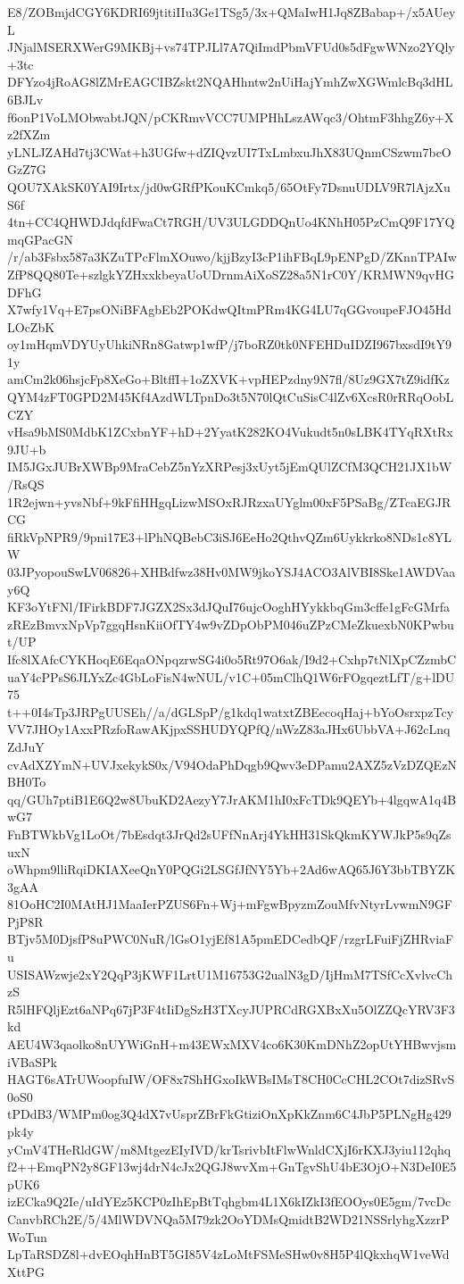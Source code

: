 E8/ZOBmjdCGY6KDRI69jtitiIIu3Ge1TSg5/3x+QMaIwH1Jq8ZBabap+/x5AUeyL
JNjalMSERXWerG9MKBj+vs74TPJLl7A7QiImdPbmVFUd0s5dFgwWNzo2YQly+3tc
DFYzo4jRoAG8lZMrEAGCIBZskt2NQAHhntw2nUiHajYmhZwXGWmlcBq3dHL6BJLv
f6onP1VoLMObwabtJQN/pCKRmvVCC7UMPHhLszAWqc3/OhtmF3hhgZ6y+Xz2fXZm
yLNLJZAHd7tj3CWat+h3UGfw+dZIQvzUI7TxLmbxuJhX83UQnmCSzwm7bcOGzZ7G
QOU7XAkSK0YAI9Irtx/jd0wGRfPKouKCmkq5/65OtFy7DsnuUDLV9R7lAjzXuS6f
4tn+CC4QHWDJdqfdFwaCt7RGH/UV3ULGDDQnUo4KNhH05PzCmQ9F17YQmqGPacGN
/r/ab3Fsbx587a3KZuTPcFlmXOuwo/kjjBzyI3cP1ihFBqL9pENPgD/ZKnnTPAIw
ZfP8QQ80Te+szlgkYZHxxkbeyaUoUDrnmAiXoSZ28a5N1rC0Y/KRMWN9qvHGDFhG
X7wfy1Vq+E7psONiBFAgbEb2POKdwQItmPRm4KG4LU7qGGvoupeFJO45HdLOcZbK
oy1mHqmVDYUyUhkiNRn8Gatwp1wfP/j7boRZ0tk0NFEHDuIDZI967bxsdI9tY91y
amCm2k06hsjcFp8XeGo+BltffI+1oZXVK+vpHEPzdny9N7fl/8Uz9GX7tZ9idfKz
QYM4zFT0GPD2M45Kf4AzdWLTpnDo3t5N70lQtCuSisC4lZv6XcsR0rRRqOobLCZY
vHsa9bMS0MdbK1ZCxbnYF+hD+2YyatK282KO4Vukudt5n0sLBK4TYqRXtRx9JU+b
IM5JGxJUBrXWBp9MraCebZ5nYzXRPesj3xUyt5jEmQUlZCfM3QCH21JX1bW/RsQS
1R2ejwn+yvsNbf+9kFfiHHgqLizwMSOxRJRzxaUYglm00xF5PSaBg/ZTcaEGJRCG
fiRkVpNPR9/9pni17E3+lPhNQBebC3iSJ6EeHo2QthvQZm6Uykkrko8NDs1c8YLW
03JPyopouSwLV06826+XHBdfwz38Hv0MW9jkoYSJ4ACO3AlVBI8Ske1AWDVaay6Q
KF3oYtFNl/IFirkBDF7JGZX2Sx3dJQuI76ujcOoghHYykkbqGm3cffe1gFcGMrfa
zREzBmvxNpVp7ggqHsnKiiOfTY4w9vZDpObPM046uZPzCMeZkuexbN0KPwbut/UP
Ifc8lXAfcCYKHoqE6EqaONpqzrwSG4i0o5Rt97O6ak/I9d2+Cxhp7tNlXpCZzmbC
uaY4cPPsS6JLYxZc4GbLoFisN4wNUL/v1C+05mClhQ1W6rFOgqeztLfT/g+lDU75
t++0I4sTp3JRPgUUSEh//a/dGLSpP/g1kdq1watxtZBEecoqHaj+bYoOsrxpzTcy
VV7JHOy1AxxPRzfoRawAKjpxSSHUDYQPfQ/nWzZ83aJHx6UbbVA+J62cLnqZdJuY
cvAdXZYmN+UVJxekykS0x/V94OdaPhDqgb9Qwv3eDPamu2AXZ5zVzDZQEzNBH0To
qq/GUh7ptiB1E6Q2w8UbuKD2AezyY7JrAKM1hI0xFcTDk9QEYb+4lgqwA1q4BwG7
FnBTWkbVg1LoOt/7bEsdqt3JrQd2sUFfNnArj4YkHH31SkQkmKYWJkP5s9qZsuxN
oWhpm9lliRqiDKIAXeeQnY0PQGi2LSGfJfNY5Yb+2Ad6wAQ65J6Y3bbTBYZK3gAA
81OoHC2I0MAtHJ1MaaIerPZUS6Fn+Wj+mFgwBpyzmZouMfvNtyrLvwmN9GFPjP8R
BTjv5M0DjsfP8uPWC0NuR/lGsO1yjEf81A5pmEDCedbQF/rzgrLFuiFjZHRviaFu
USISAWzwje2xY2QqP3jKWF1LrtU1M16753G2ualN3gD/IjHmM7TSfCcXvlvcChzS
R5lHFQljEzt6aNPq67jP3F4tIiDgSzH3TXcyJUPRCdRGXBxXu5OlZZQcYRV3F3kd
AEU4W3qaolko8nUYWiGnH+m43EWxMXV4co6K30KmDNhZ2opUtYHBwvjsmiVBaSPk
HAGT6sATrUWoopfuIW/OF8x7ShHGxoIkWBsIMsT8CH0CcCHL2COt7dizSRvS0oS0
tPDdB3/WMPm0og3Q4dX7vUsprZBrFkGtiziOnXpKkZnm6C4JbP5PLNgHg429pk4y
yCmV4THeRldGW/m8MtgezEIyIVD/krTsrivbItFlwWnldCXjI6rKXJ3yiu112qhq
f2++EmqPN2y8GF13wj4drN4cJx2QGJ8wvXm+GnTgvShU4bE3OjO+N3DeI0E5pUK6
izECka9Q2Ie/uIdYEz5KCP0zIhEpBtTqhgbm4L1X6kIZkI3fEOOys0E5gm/7vcDc
CanvbRCh2E/5/4MlWDVNQa5M79zk2OoYDMsQmidtB2WD21NSSrlyhgXzzrPWoTun
LpTaRSDZ8l+dvEOqhHnBT5GI85V4zLoMtFSMeSHw0v8H5P4lQkxhqW1veWdXttPG
